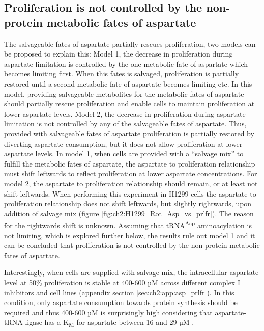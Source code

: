 \subsection{Proliferation is not controlled by the non-protein metabolic fates of aspartate}
The salvageable fates of aspartate partially rescues proliferation, two models can be proposed to explain this:
Model 1, the decrease in proliferation during aspartate limitation is controlled by the one metabolic fate of aspartate which becomes limiting first.
When this fates is salvaged, proliferation is partially restored until a second metabolic fate of aspartate becomes limiting etc.
In this model, providing salvageable metabolites for the metabolic fates of aspartate should partially rescue proliferation and enable cells to maintain proliferation at lower aspartate levels.
Model 2, the decrease in proliferation during aspartate limitation is not controlled by any of the salvageable fates of aspartate.
Thus, provided with salvageable fates of aspartate proliferation is partially restored by diverting aspartate consumption, but it does not allow proliferation at lower aspartate levels.
In model 1, when cells are provided with a ``salvage mix'' to fulfill the metabolic fates of aspartate, the aspartate to proliferation relationship must shift leftwards to reflect proliferation at lower aspartate concentrations.
For model 2, the aspartate to proliferation relationship should remain, or at least not shift leftwards.
When performing this experiment in H1299 cells the aspartate to proliferation relationship does not shift leftwards, but slightly rightwards, upon addition of salvage mix (figure \ref{fig:ch2:H1299_Rot_Asp_vs_prlfr}).
The reason for the rightwards shift is unknown.
Assuming that tRNA\textsuperscript{Asp} aminoacylation is not limiting, which is explored further below, the results rule out model 1 and it can be concluded that proliferation is not controlled by the non-protein metabolic fates of aspartate.

Interestingly, when cells are supplied with salvage mix, the intracellular aspartate level at 50\% proliferation is stable at 400-600 µM across different complex I inhibitors and cell lines (appendix section \ref{sec:ch2:app:asp_prlfr}).
In this condition, only aspartate consumption towards protein synthesis should be required and thus 400-600 µM is surprisingly high considering that aspartate-tRNA ligase has a K\textsubscript{M} for aspartate between 16 and 29 µM \cite{Bour2009-fx, Escalante1993-jy, Messmer2009-xm}.

